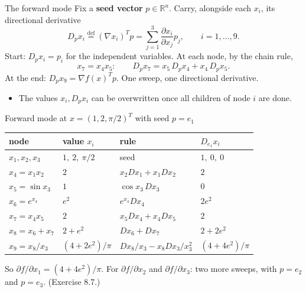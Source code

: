 \documentclass[12pt,aspectratio=169]{beamer}
\newcommand{\R}{\mathbb{R}}
\begin{document}
\begin{frame}{The forward mode}
  Fix a \textbf{seed vector} $p\in\R^n$. Carry, alongside each $x_i$, its directional derivative
  \begin{equation}
    D_px_i \overset{\text{def}}{=} (\nabla x_i)^Tp = \sum_{j=1}^3\frac{\partial x_i}{\partial x_j}p_j,
    \qquad i=1,\dots,9. \tag{8.28}
  \end{equation}
  Start: $D_px_i=p_i$ for the independent variables. At each node, by the chain rule,
  \begin{equation}
    x_7=x_4x_5:\qquad D_px_7 = x_5\,D_px_4 + x_4\,D_px_5. \tag{8.29}
  \end{equation}
  At the end: $D_px_9 = \nabla f(x)^Tp$. \alert{One sweep, one directional derivative.}

  \begin{itemize}
    \item The values $x_i, D_px_i$ can be overwritten once all children of node $i$ are done.
  \end{itemize}
\end{frame}

\begin{frame}{Forward mode at $x=(1,2,\pi/2)^T$ with seed $p=e_1$}
  \centering
  \renewcommand{\arraystretch}{1.15}
  \begin{tabular}{llll}
    \toprule
    node & value $x_i$ & rule & $D_{e_1}x_i$\\
    \midrule
    $x_1,x_2,x_3$ & $1,\ 2,\ \pi/2$ & seed & $1,\ 0,\ 0$\\
    $x_4=x_1x_2$ & $2$ & $x_2D x_1+x_1Dx_2$ & $2$\\
    $x_5=\sin x_3$ & $1$ & $\cos x_3\,Dx_3$ & $0$\\
    $x_6=e^{x_4}$ & $e^2$ & $e^{x_4}Dx_4$ & $2e^2$\\
    $x_7=x_4x_5$ & $2$ & $x_5Dx_4+x_4Dx_5$ & $2$\\
    $x_8=x_6+x_7$ & $2+e^2$ & $Dx_6+Dx_7$ & $2+2e^2$\\
    $x_9=x_8/x_3$ & $(4+2e^2)/\pi$ & $Dx_8/x_3-x_8Dx_3/x_3^2$ & $(4+4e^2)/\pi$\\
    \bottomrule
  \end{tabular}

  \vspace{1.5ex}
  \raggedright
  So $\partial f/\partial x_1 = (4+4e^2)/\pi$. For $\partial f/\partial x_2$ and $\partial f/\partial x_3$:
  two more sweeps, with $p=e_2$ and $p=e_3$. (Exercise 8.7.)
\end{frame}
\end{document}
